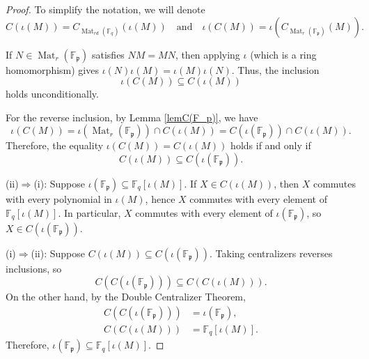 \documentclass[10pt,a4paper]{amsart}
\newcommand{\F}{\mathbb{F}}
\DeclareMathOperator{\Mat}{Mat}
\newcommand{\fp}{\mathfrak{p}}
\begin{document}
 \begin{proof} To simplify the notation, we will denote 
 	\[C(\iota(M))= C_{\Mat_{rd}(\F_q)}(\iota(M))\quad \text{and}\quad \iota(C(M))=\iota\left(C_{\Mat_r(\F_\fp)}(M)\right).
 	\] 
 	
 	If $N\in \Mat_r(\F_\fp)$ satisfies $NM=MN$, then applying $\iota$ (which is a ring homomorphism) gives $\iota(N)\iota(M)=\iota(M)\iota(N)$. 
 	Thus, the inclusion  
 	\[
 	\iota\left(C(M)\right) \subseteq C(\iota(M)) 
 	\]
 	holds unconditionally. 
 	
 	For the reverse inclusion, by Lemma \ref{lemC(F_p)}, we have 
 	\[
 	\iota\left(C(M)\right)  = 	\iota(\Mat_r(\F_\fp))  \cap C(\iota(M)) = C(\iota(\F_\fp)) \cap C(\iota(M)). 
 	\]
 	Therefore, the equality $\iota\left(C(M)\right)  = C(\iota(M))$ holds if and only if 
 	\[
 	C(\iota(M))\subseteq C(\iota(\F_\fp)). 
 	\]
 	
 	(ii)$\Rightarrow$(i): Suppose $\iota(\F_\fp)\subseteq \F_q[\iota(M)]$. If $X\in C(\iota(M))$, then $X$ commutes with every 
 	polynomial in $\iota(M)$, hence $X$ commutes with every element of $\F_q[\iota(M)]$. In particular, $X$ commutes 
 	with every element of $\iota(\F_\fp)$, so $X\in C(\iota(\F_\fp))$. 
 	
 	(i)$\Rightarrow$(ii):  Suppose $C(\iota(M))\subseteq C(\iota(\F_\fp))$. Taking centralizers reverses inclusions, so 
 	\[
 	C(C(\iota(\F_\fp)))\subseteq C(C(\iota(M))). 
 	\]
 	On the other hand, by the Double Centralizer Theorem, 
 	\begin{align*}
 	C(C(\iota(\F_\fp))) &= \iota(\F_\fp), \\ 
 	C(C(\iota(M))) &= \F_q[\iota(M)].  
 	\end{align*}
 	Therefore, $\iota(\F_\fp) \subseteq \F_q[\iota(M)]$. 
 \end{proof}
\end{document}
